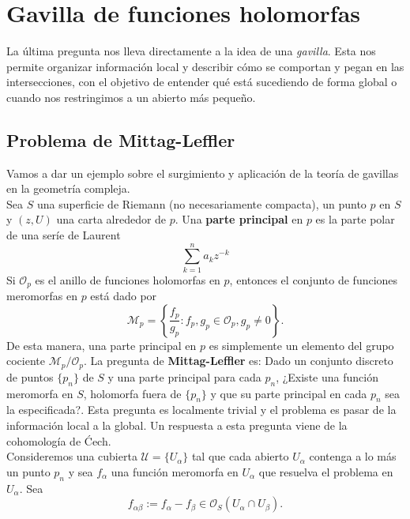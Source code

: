 \section{Gavilla de funciones holomorfas}

La última pregunta nos lleva directamente a la idea de una \textit{gavilla}. Esta nos permite organizar información local y describir cómo se comportan y pegan en las intersecciones, con el objetivo de entender qué está sucediendo de forma global o cuando nos restringimos a un abierto más pequeño.

\subsection{Problema de Mittag-Leffler}
	Vamos a dar un ejemplo sobre el surgimiento y aplicación de la teoría de gavillas en la geometría compleja.\\
	Sea $S$ una superficie de Riemann (no necesariamente compacta), un punto $p$ en $S$ y $(z,U)$ una carta alrededor de $p$. Una \textbf{parte principal} en $p$ es la parte polar de una seríe de Laurent
	\begin{equation*}
			\sum_{k=1}^na_kz^{-k}
		\end{equation*} 
	Si $\mathscr{O}_p$ es el anillo de funciones holomorfas en $p$, entonces el conjunto de funciones meromorfas en $p$ está dado por
	\begin{equation*}
			\mathscr{M}_p=\left\{\frac{f_p}{g_p}: f_p,g_p\in\mathscr{O}_p, g_p\neq 0\right\}.
		\end{equation*}
	De esta manera, una parte principal en $p$ es simplemente un elemento del grupo cociente $\mathscr{M}_p/\mathscr{O}_p$. La pregunta de \textbf{Mittag-Leffler} es: Dado un conjunto discreto de puntos $\{p_n\}$ de $S$ y una parte principal para cada $p_n$, ¿Existe una función meromorfa en $S$, holomorfa fuera de $\{p_n\}$ y que su parte principal en cada $p_n$ sea la especificada?. Esta pregunta es localmente trivial y el problema es pasar de la información local a la global. Un respuesta a esta pregunta viene de la cohomología de Ćech.\\
	Consideremos una cubierta $\mathscr{U}=\{U_\alpha\}$ tal que cada abierto $U_\alpha$ contenga a lo más un punto $p_n$ y sea $f_\alpha$ una función meromorfa en $U_\alpha$ que resuelva el problema en $U_\alpha$. Sea
	\begin{equation*}
			f_{\alpha\beta}:=f_\alpha-f_\beta\in\mathscr{O}_S(U_\alpha\cap U_\beta).
		\end{equation*}
